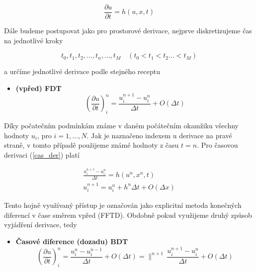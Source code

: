 \begin{equation}
\frac{\partial u}{\partial t} = h(u, x, t)
\label{cas_der}
\end{equation}

Dále budeme postupovat jako pro prostorové derivace, nejprve diskretizujeme čas na 
jednotlivé kroky

$$
t_0, t_1, t_2, \dots, t_{n}, \dots, t_{M} \quad (t_0 < t_1 < t_2 \dots < t_{M})
$$

a určíme jednotlivé derivace podle stejného receptu

\begin{tcolorbox}[title=Časové diference I. řádu]
\begin{itemize}
\item{{\bf  (vpřed) FDT}
\begin{equation}
  \left( \frac{\partial u}{\partial t} \right)_{i}^{n}
= \frac{u_{i}^{n+1} - u_{i}^{n}}{\Delta t} + O(\Delta t)
\label{FD}
\end{equation}}
\end{itemize}
\end{tcolorbox}

Díky počatečním podmínkám známe v daném počátečním okamžiku všechny hodnoty $u_i$, 
pro $i=1,\dots,N$. Jak je naznačeno indexem u derivace na pravé straně, v tomto 
případě použijeme známé hodnoty z času $t=n$. Pro časovou derivaci (\ref{cas_der}) 
platí

\begin{eqnarray}
\frac{u_{i}^{n+1} - u_{i}^{n}}{\Delta t} = h(u^{n}, x^{n}, t)
\\
u_{i}^{n+1} = u_{i}^n + h^{n} \Delta{t} + O(\Delta x)
\end{eqnarray}

Tento hojně využívaný přístup je označován jako explicitní metoda konečných 
diferencí v čase směrem vpřed (FFTD). Obdobně pokud využijeme druhý způsob 
vyjádření derivace, tedy

\begin{tcolorbox}[title=Časové diference I. řádu]
\begin{itemize}
    \item{{\bf Časové diference (dozadu) BDT}
\begin{equation}
\left( \frac{\partial u}{\partial t} \right)_{i}^{n}
= \frac{u_{i}^{n}-u_{i}^{n-1}}{\Delta t} + O(\Delta t) = \|^{n+1}\, 
  \frac{u_{i}^{n+1}-u_{i}^{n}}{\Delta t} + O(\Delta t) 
\label{BD}
\end{equation}}
\end{itemize}
\end{tcolorbox}


